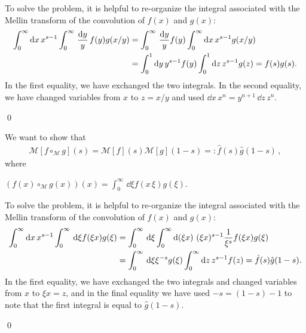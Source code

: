 To solve the problem, it is helpful to re-organize the integral associated with the Mellin transform of the convolution of \(f(x)\) and \(g(x)\):
\begin{align}
    \int_0^\infty \dd x\, x^{s-1}
    \int_0^\infty \,\frac{\dd y}{y}\,
    f(y) g(x/y)
    &=
    \int_0^\infty \,\frac{\dd y}{y}
    f(y)
    \int_0^\infty \dd x\,
    x^{s-1} g(x/y)
    \\
    \notag
    &=
    \int_0^1 \dd y \, y^{s-1} f(y)
    \int_0^1 \dd z\, z^{s-1} g(z)
    =
    f(s) g(s)
    .
\end{align}
In the first equality, we have exchanged the two integrals. %
%
In the second equality, we have changed variables from \(x\) to \(z = x/y\) and used \(\dd x\, x^n = y^{n+1}\, \dd z\, z^n\).

\qed{}


We want to show that
\begin{align}
    \mathcal M[f \circ_{\mathcal M} g](s) = \mathcal M[f](s) \mathcal M[g](1-s)
    =:
    \hat{f}(s) \hat{g}(1-s)
    \,,
\end{align}
where

\(
    (f(x) \circ_{\mathcal M} g(x))(x)
    =
    \int_0^\infty\,\dd\xi f(x\,\xi) g(\xi)
    .
\)


To solve the problem, it is helpful to re-organize the integral associated with the Mellin transform of the convolution of \(f(x)\) and \(g(x)\):
\begin{align}
    \int_0^\infty \dd x\, x^{s-1}
    \int_0^\infty \, \dd \xi
    f(\xi x) g(\xi)
    &=
    \int_0^\infty \, \dd \xi
    \int_0^\infty \dd (\xi x)\, (\xi x)^{s-1}
    \frac{1}{\xi^s}
    f(\xi x) g(\xi)
    \\
    \notag
    &=
    \int_0^\infty \, \dd \xi
    \xi^{-s}
    g(\xi)
    \int_0^\infty \dd z\, z^{s-1}
    f(z)
    =
    \hat{f}(s) \hat{g}(1-s)
    .
\end{align}
In the first equality, we have exchanged the two integrals and changed variables from \(x\) to \(\xi x = z\), and in the final equality we have used \(-s = (1-s) - 1\) to note that the first integral is equal to \(\hat{g}(1-s)\).

\qed{}



